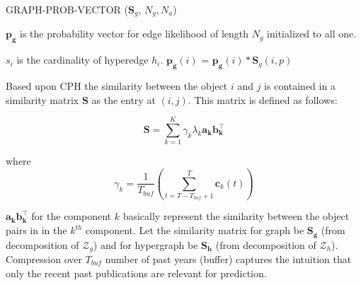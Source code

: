 \documentclass{sig-alternate}
\begin{document}
\begin{algorithm} %
\caption{GRAPH-PROB-VECTOR ($\mathbf{S}_g$, $N_g, N_a$)} %
\label{alg2} %
\begin{algorithmic}[1] %

\STATE $\mathbf{p_g}$ is the probability vector for edge likelihood of length $N_g$ initialized to all one.

\STATE $s_i$ is the cardinality of hyperedge $h_i$.
\STATE $\mathbf{p_g}(i)$ = $\mathbf{p_g}(i) \ast \mathbf{S}_g (i,p)$ 
\ENDFOR 
\ENDFOR 
\ENDFOR \\


\end{algorithmic}
\end{algorithm}

Based upon CPH the similarity between the object \(i\) and \(j\) is contained in a similarity matrix $\mathbf{S}$ as the entry at $(i,j)$. This matrix is defined as follows:

\begin{equation}
\mathbf{S} = \sum \limits_{k=1}^{K} \gamma_k \lambda_k \mathbf{a_k} \mathbf{b_k^\top}
\end{equation}

where \begin{equation} \gamma_k = \frac{1}{T_{buf}} \left( \sum \limits_{t=T-T_{buf}+1}^{T} \mathbf{c}_k(t) \right) \end{equation}


$\mathbf{a_kb_k^{\top}}$ for the component $k$ basically represent the similarity between the object pairs in in the $k^{th}$ component. Let the similarity matrix for graph be $\mathbf{S_g}$ (from decomposition of $\mathscr{Z}_{g}$) and for hypergraph be $\mathbf{S_h}$ (from decomposition of $\mathscr{Z}_{h}$). Compression over $T_{buf}$ number of past years (buffer) captures the intuition that only the recent past publications are relevant for prediction. 

\end{document}
